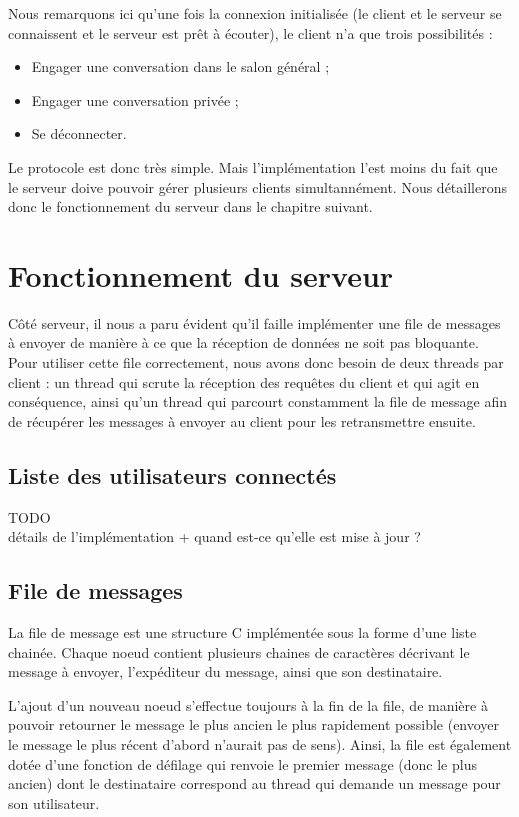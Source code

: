 		Nous remarquons ici qu'une fois la connexion initialisée (le client et le serveur se connaissent et le serveur est prêt à écouter), le client n'a que trois possibilités :
		\begin{itemize}
			\item Engager une conversation dans le salon général ;
			\item Engager une conversation privée ;
			\item Se déconnecter.
		\end{itemize}
		
		Le protocole est donc très simple. Mais l'implémentation l'est moins du fait que le serveur doive pouvoir gérer plusieurs clients simultannément. Nous détaillerons donc le fonctionnement du serveur dans le chapitre suivant.
		
	
	\section{Fonctionnement du serveur}
		
		Côté serveur, il nous a paru évident qu'il faille implémenter une file de messages à envoyer de manière à ce que la réception de données ne soit pas bloquante. Pour utiliser cette file correctement, nous avons donc besoin de deux threads par client : un thread qui scrute la réception des requêtes du client et qui agit en conséquence, ainsi qu'un thread qui parcourt constamment la file de message afin de récupérer les messages à envoyer au client pour les retransmettre ensuite.
	
		\subsection{Liste des utilisateurs connectés}
			{\Huge TODO} \\
			détails de l'implémentation + quand est-ce qu'elle est mise à jour ?
			
		\subsection{File de messages}
			La file de message est une structure C implémentée sous la forme d'une liste chainée. Chaque noeud contient plusieurs chaines de caractères décrivant le message à envoyer, l'expéditeur du message, ainsi que son destinataire.
			
			L'ajout d'un nouveau noeud s'effectue toujours à la fin de la file, de manière à pouvoir retourner le message le plus ancien le plus rapidement possible (envoyer le message le plus récent d'abord n'aurait pas de sens). Ainsi, la file est également dotée d'une fonction de défilage qui renvoie le premier message (donc le plus ancien) dont le destinataire correspond au thread qui demande un message pour son utilisateur.\\
			
